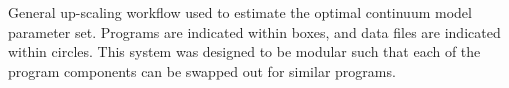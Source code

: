 \label{fig:workflow} General up-scaling workflow used to estimate the optimal continuum model parameter set. Programs are indicated within boxes, and data files are indicated within circles. This system was designed to be modular such that each of the program components can be swapped out for similar programs. 
